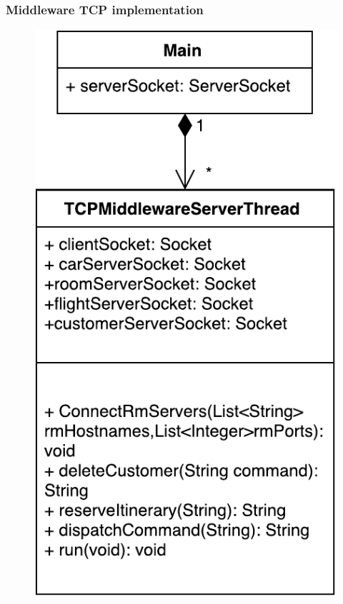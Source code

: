 \documentclass[10pt]{beamer}
\begin{document}
\begin{frame}
\frametitle{Middleware TCP implementation}
\begin{figure}
\centering
\includegraphics[scale=0.5]{figures/middleware-class.pdf}
\end{figure}
\end{frame}
\end{document}
